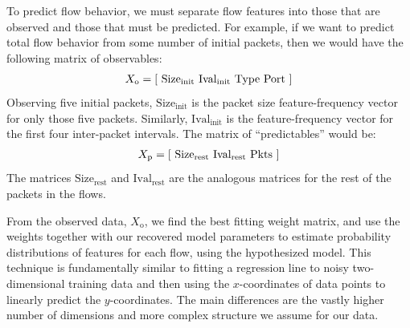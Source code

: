 \documentclass{acm_proc_article-sp}
\begin{document}
To predict flow behavior, we must separate flow features into those that are observed and those that must be predicted.
For example, if we want to predict total flow behavior from some number of initial packets, then we would have the following matrix of observables:
\begin{align}
  X_\text{o} = {\left[ ~
    \text{Size}_\text{init} ~
    \text{Ival}_\text{init} ~
    \text{Type} ~
    \text{Port} ~
  \right]}
\end{align}
Observing five initial packets, $\text{Size}_\text{init}$ is the packet size feature-frequency vector for only those five packets. Similarly, $\text{Ival}_\text{init}$ is the feature-frequency vector for the first four inter-packet intervals.
The matrix of ``predictables'' would be:
\begin{align}
  X_\text{p} = {\left[ ~
    \text{Size}_\text{rest} ~
    \text{Ival}_\text{rest} ~
    \text{Pkts} ~
  \right]}
\end{align}
The matrices $\text{Size}_\text{rest}$ and $\text{Ival}_\text{rest}$ are the analogous  matrices for the rest of the packets in the flows.

From the observed data, $X_\text{o}$, we find the best fitting weight matrix, and use the weights together with our recovered model parameters to estimate probability distributions of features for each flow, using the hypothesized model.
This technique is fundamentally similar to fitting a regression line to noisy two-dimensional training data and then using the $x$-coordinates of data points to linearly predict the $y$-coordinates.
The main differences are the vastly higher number of dimensions and more complex structure we assume for our data.

\end{document}
